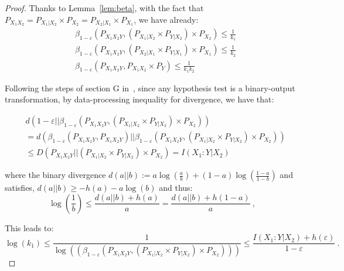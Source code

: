 \documentclass[11pt]{article}
\theoremstyle{definition}
\theoremstyle{remark}
\begin{document}
  \begin{proof}
    Thanks to Lemma~\ref{lem:beta}, with the fact that $P_{X_1X_2} = P_{X_1|X_2} \times P_{X_2} = P_{X_2|X_1} \times P_{X_1}$, we have already:
    \begin{equation}
      \begin{aligned}
        &\beta_{1-\varepsilon}\left(P_{X_1X_2Y},\left(P_{X_1|X_2} \times P_{Y|X_2} \right) \times P_{X_2}\right) \leq \frac{1}{k_1}\\
        &\beta_{1-\varepsilon}\left(P_{X_1X_2Y},\left(P_{X_2|X_1} \times P_{Y|X_1} \right) \times P_{X_1}\right) \leq \frac{1}{k_2}\\
        &\beta_{1-\varepsilon}\left(P_{X_1X_2Y},P_{X_1X_2} \times P_{Y}\right) \leq \frac{1}{k_1k_2}       
      \end{aligned}
    \end{equation}

    Following the steps of section G in~\cite{PPV10}, since any hypothesis test is a binary-output transformation, by data-processing inequality for divergence, we have that:

    \begin{equation}
      \begin{aligned}
        &d\left(1-\varepsilon||\beta_{1-\varepsilon}\left(P_{X_1X_2Y},\left(P_{X_1|X_2} \times P_{Y|X_2} \right) \times P_{X_2}\right)\right)\\
        &= d\left(\beta_{1-\varepsilon}\left(P_{X_1X_2Y},P_{X_1X_2Y}\right)||\beta_{1-\varepsilon}\left(P_{X_1X_2Y},\left(P_{X_1|X_2} \times P_{Y|X_2} \right) \times P_{X_2}\right)\right)\\
        &\leq D\left(P_{X_1X_2Y}||\left(P_{X_1|X_2} \times P_{Y|X_2} \right) \times P_{X_2}\right) = I(X_1:Y|X_2)
      \end{aligned}
    \end{equation}
      

    where the binary divergence $d(a||b):= a\log\left(\frac{a}{b}\right) + (1-a)\log\left(\frac{1-a}{1-b}\right)$ and satisfies, $d(a||b) \geq -h(a) - a\log(b)$ and thus:
    \[ \log(\frac{1}{b}) \leq \frac{d(a||b) + h(a)}{a} = \frac{d(a||b) + h(1-a)}{a} \ , \]

    This leads to:
    \[\log(k_1) \leq \frac{1}{\log\left(\left(\beta_{1-\varepsilon}\left(P_{X_1X_2Y},\left(P_{X_1|X_2} \times P_{Y|X_2} \right) \times P_{X_2}\right)\right)\right)} \leq \frac{I(X_1:Y|X_2) + h(\varepsilon)}{1-\varepsilon} \ .\]


\end{proof}
\end{document}
